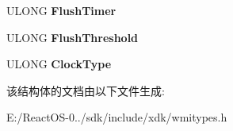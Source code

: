 \begin{DoxyCompactItemize}
U\+L\+O\+NG {\bfseries Flush\+Timer}
\item 
\mbox{\label{struct___e_t_w___t_r_a_c_e___s_e_s_s_i_o_n___s_e_t_t_i_n_g_s_ae2c8d04086a664ddd31f922b5740f016}} 
U\+L\+O\+NG {\bfseries Flush\+Threshold}
\item 
\mbox{\label{struct___e_t_w___t_r_a_c_e___s_e_s_s_i_o_n___s_e_t_t_i_n_g_s_ac132331560ea6b0be1a2438af5ad6c54}} 
U\+L\+O\+NG {\bfseries Clock\+Type}
\end{DoxyCompactItemize}


该结构体的文档由以下文件生成\+:\begin{DoxyCompactItemize}
\item 
E\+:/\+React\+O\+S-\/0../sdk/include/xdk/wmitypes.\+h\end{DoxyCompactItemize}
